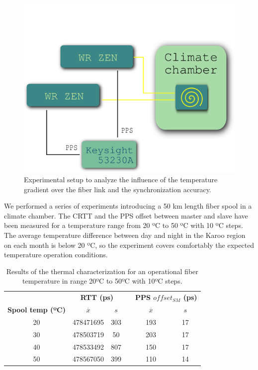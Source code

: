 \begin{figure}
	\centering
	\includegraphics[width=0.7\linewidth]{img/tempsetup}
	\caption[Configuration of the climate chamber experiments]{Experimental 
		setup to analyze the influence of the temperature gradient over the 
		fiber link and the synchronization accuracy.}
	\label{fig:tempsetup}
\end{figure}

We performed a series of experiments introducing a 50 km length fiber spool in 
a climate chamber. The CRTT and the PPS offset between master and slave have 
been measured for a temperature range from 20 ºC to 50 ºC with 10 ºC steps. 
The average temperature difference between day and night in the Karoo region on 
each month is below 20 ºC, so the experiment covers comfortably the expected 
temperature operation conditions.

\begin{table}\centering
	\begin{tabular}{@{} cccccc@{}}%
		& \multicolumn{2}{c}{\bfseries{RTT (ps)}} & &
		\multicolumn{2}{c}{\bfseries{PPS $offset_{SM}$ (ps)}} \\
		\cmidrule(l){2-3}  \cmidrule{5-6}
		\textbf{Spool temp (ºC)} & $\overline{x}$ & $s$ & & $\overline{x}$ 
		& $s$ \\ \midrule
		\small{20} & 478471695 & 303 & & 193 & 17 \\
		\small{30} & 478503719 & 50  & & 203 & 17 \\
		\small{40} & 478533492 & 807 & & 150 & 17 \\
		\small{50} & 478567050 & 399 & & 110 & 14 \\
		\bottomrule
	\end{tabular}
	\caption{Results of the thermal characterization for an operational fiber 
		temperature in range 20ºC to 50ºC with 10ºC steps.}
	\label{tab:temp}
\end{table}

